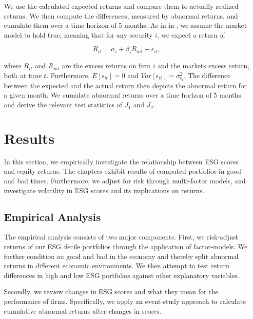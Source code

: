 \documentclass[11pt]{article}
\begin{document}
We use the calculated expected returns and compare them to actually realized returns. We then compute the differences, measured by abnormal returns, and cumulate them over a time horizon of 5 months. As in in \citet{Campbell1997}, we assume the market model to hold true, meaning that for any security $i$, we expect a return of 

\begin{equation}
R_{it} = \alpha_i + \beta_i  R_{mt} + \epsilon_{it},
\end{equation}

where $R_{it}$ and $R_{mt}$ are the excess returns on firm $i$ and the markets excess return, both at time $t$. Furthermore, $E[\epsilon_{it}] = 0$ and $Var[\epsilon_{it}] = \sigma^2_{\epsilon_{i}}$. The difference between the expected and the actual return then depicts the abnormal return for a given month. We cumulate abnormal returns over a time horizon of 5 months and derive the relevant test statistics of $J_1$ and $J_2$.




\section{Results}


In this section, we empirically investigate the relationship between ESG scores and equity returns. The chapters exhibit results of computed portfolios in good and bad times. Furthermore, we adjust for risk through multi-factor models, and investigate volatility in ESG scores and its implications on returns.

\subsection{Empirical Analysis}

The empirical analysis consists of two major components. First, we risk-adjust returns of our ESG decile portfolios through the application of factor-models. We further condition on good and bad in the economy and thereby split abnormal returns in different economic environments. We then attempt to test return differences in high and low ESG portfolios against other explanatory variables. 

Secondly, we review changes in ESG scores and what they mean for the performance of firms. Specifically, we apply an event-study approach to calculate cumulative abnormal returns after changes in scores.
\end{document}
